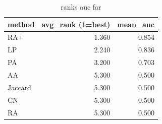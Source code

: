 \begin{table}[t]
\centering
\caption{ranks auc far}
\label{tab:ranks_auc_far}
\begin{tabular}{lrr}
\hline
method & avg\_rank (1=best) & mean\_auc \\
\hline
RA+ & 1.360 & 0.854 \\
LP & 2.240 & 0.836 \\
PA & 3.200 & 0.703 \\
AA & 5.300 & 0.500 \\
Jaccard & 5.300 & 0.500 \\
CN & 5.300 & 0.500 \\
RA & 5.300 & 0.500 \\
\hline
\end{tabular}
\end{table}